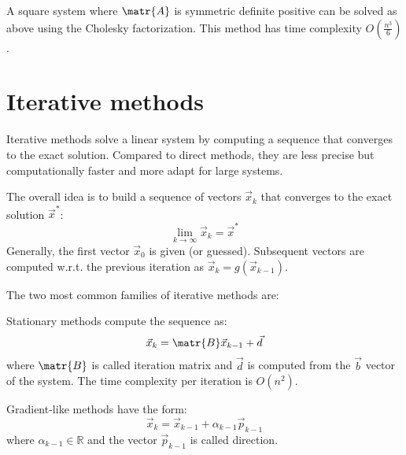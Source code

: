 A square system where $\matr{A}$ is symmetric definite positive can be solved as above using the Cholesky factorization.
This method has time complexity $O(\frac{n^3}{6})$.




\section{Iterative methods}
Iterative methods solve a linear system by computing a sequence that converges to the exact solution.
Compared to direct methods, they are less precise but computationally faster and more adapt for large systems. 

The overall idea is to build a sequence of vectors $\vec{x}_k$ 
that converges to the exact solution $\vec{x}^*$:
\[ \lim_{k \rightarrow \infty} \vec{x}_k = \vec{x}^* \]
Generally, the first vector $\vec{x}_0$ is given (or guessed). Subsequent vectors are computed w.r.t. the previous iteration 
as $\vec{x}_k = g(\vec{x}_{k-1})$.

The two most common families of iterative methods are:
\begin{descriptionlist}
    \item[Stationary methods] 
        compute the sequence as:
        \[ \vec{x}_k = \matr{B}\vec{x}_{k-1} + \vec{d} \]
        where $\matr{B}$ is called iteration matrix and $\vec{d}$ is computed from the $\vec{b}$ vector of the system.
        The time complexity per iteration is $O(n^2)$.
    
    \item[Gradient-like methods] 
        have the form:
        \[ \vec{x}_k = \vec{x}_{k-1} + \alpha_{k-1}\vec{p}_{k-1} \]
        where $\alpha_{k-1} \in \mathbb{R}$ and the vector $\vec{p}_{k-1}$ is called direction.
\end{descriptionlist}

